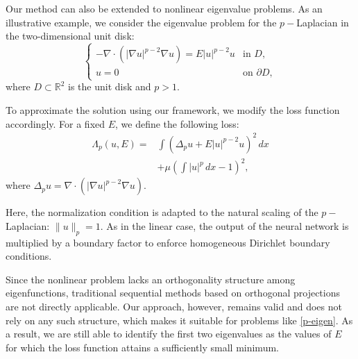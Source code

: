 \documentclass[reprint,superscriptaddress,aps,prl]{revtex4-2}
\newcommand{\R}{\mathbb{R}}
\begin{document}
Our method can also be extended to nonlinear eigenvalue problems. As an illustrative example, we consider the eigenvalue problem for the $p-$Laplacian in the two-dimensional unit disk:
\begin{equation}\label{p-eigen}
\begin{cases}
-\nabla \cdot (|\nabla u|^{p-2} \nabla u) = E |u|^{p-2} u & \text{in } D, \\
u = 0 & \text{on } \partial D,
\end{cases}
\end{equation}
where $D \subset \R^2$ is the unit disk and $p > 1$.

To approximate the solution using our framework, we modify the loss function accordingly. For a fixed $E$, we define the following loss:
\begin{align*}
\Lambda_p(u, E) = & \int \left( \Delta_p u + E |u|^{p-2} u \right)^2 \, dx \\
&+ \mu \left( \int |u|^p\, dx - 1 \right)^2,
\end{align*}
where $\Delta_p u = \nabla \cdot (|\nabla u|^{p-2} \nabla u)$.

Here, the normalization condition is adapted to the natural scaling of the $p-$Laplacian: $\|u\|_p = 1$. As in the linear case, the output of the neural network is multiplied by a boundary factor to enforce homogeneous Dirichlet boundary conditions.

Since the nonlinear problem lacks an orthogonality structure among eigenfunctions, traditional sequential methods based on orthogonal projections are not directly applicable. Our approach, however, remains valid and does not rely on any such structure, which makes it suitable for problems like \eqref{p-eigen}. As a result, we are still able to identify the first two eigenvalues as the values of $E$ for which the loss function attains a sufficiently small minimum.


%
%
%
\end{document}
